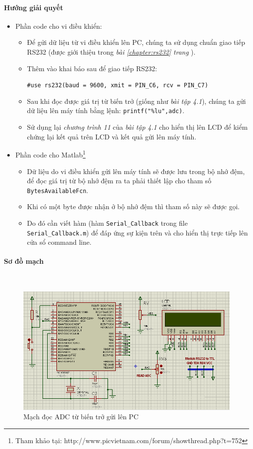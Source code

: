 \paragraph{Hướng giải quyết}
\begin{itemize}
\item Phần code cho vi điều khiển:
\begin{itemize}
\item Để gửi dữ liệu từ vi điều khiển lên PC, chúng ta sử dụng chuẩn giao tiếp RS232 (được giới thiệu trong \textit{bài \ref{chapter:rs232} trang \pageref{chapter:rs232}}).
\item Thêm vào khai báo sau để giao tiếp RS232:

\verb|#use rs232(baud = 9600, xmit = PIN_C6, rcv = PIN_C7)|
\item Sau khi đọc được giá trị từ biến trở (giống như \textit{bài tập 4.1}), chúng ta gửi dữ liệu lên máy tính bằng lệnh: \verb|printf("%lu",adc)|.
\item Sử dụng lại \textit{chương trình 11} của \textit{bài tập 4.1} cho hiển thị lên LCD để kiểm chứng lại kết quả trên LCD và kết quả gửi lên máy tính.
\end{itemize}
\item Phần code cho Matlab\footnote{Tham khảo tại: http://www.picvietnam.com/forum/showthread.php?t=752}
\begin{itemize}
\item Dữ liệu do vi điều khiển gửi lên máy tính sẽ được lưu trong bộ nhớ đệm, để đọc giá trị từ bộ nhớ đệm ra ta phải thiết lập cho tham số \verb|BytesAvailableFcn|.
\item Khi có một byte được nhận ở bộ nhớ đệm thì tham số này sẽ được gọi.
\item Do đó cần viết hàm (hàm \verb|Serial_Callback| trong file \verb|Serial_Callback.m|) để đáp ứng sự kiện trên và cho hiển thị trực tiếp lên cửa sổ command line.
\end{itemize}
\end{itemize}
\paragraph{Sơ đồ mạch}{~\\}
\begin{figure}[!h]
\begin{center}
\includegraphics[scale=0.7]{bai-4/image/BAI-4-3}
\end{center}
\caption{Mạch đọc ADC từ biến trở gửi lên PC}
\end{figure}
